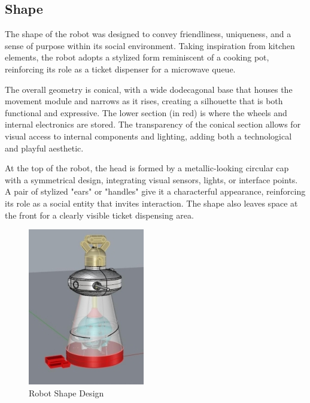 \subsection{Shape}

The shape of the robot was designed to convey friendliness, uniqueness, and a sense of purpose within its social environment. Taking inspiration from kitchen elements, the robot adopts a stylized form reminiscent of a cooking pot, reinforcing its role as a ticket dispenser for a microwave queue.

The overall geometry is conical, with a wide dodecagonal base that houses the movement module and narrows as it rises, creating a silhouette that is both functional and expressive. The lower section (in red) is where the wheels and internal electronics are stored. The transparency of the conical section allows for visual access to internal components and lighting, adding both a technological and playful aesthetic.

At the top of the robot, the head is formed by a metallic-looking circular cap with a symmetrical design, integrating visual sensors, lights, or interface points. A pair of stylized "ears" or "handles" give it a characterful appearance, reinforcing its role as a social entity that invites interaction. The shape also leaves space at the front for a clearly visible ticket dispensing area.

\begin{figure}[H]
    \centering
    \includegraphics[width=0.6\linewidth]{../ReportMovementModule/images/Aspose.Words.728084da-df58-4b9d-a372-f65cffbdb23d.009.jpeg}
    \caption{Robot Shape Design}
\end{figure}

